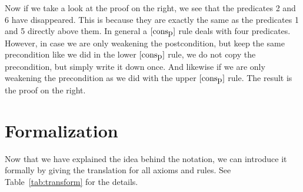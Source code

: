 \documentclass[10pt]{article}
\begin{document}
Now if we take a look at the proof on the right, we see that the predicates 2 
and 6 have disappeared.
This is because they are exactly the same as the predicates 1 and 5 directly
above them.
In general a $[\mbox{cons}_{\mbox{p}}]$ rule deals with four predicates.
However, in case we are only weakening the postcondition, but keep the same
precondition like we did in the lower $[\mbox{cons}_{\mbox{p}}]$ rule, we do not copy the
precondition, but simply write it down once. And likewise if we are only
weakening the precondition as we did with the upper $[\mbox{cons}_{\mbox{p}}]$ rule.
The result is the proof on the right.

\section{Formalization}
Now that we have explained the idea behind the notation, we can introduce
it formally by giving the translation for all axioms and rules.
See Table~\ref{tab:transform} for the details.
\end{document}

